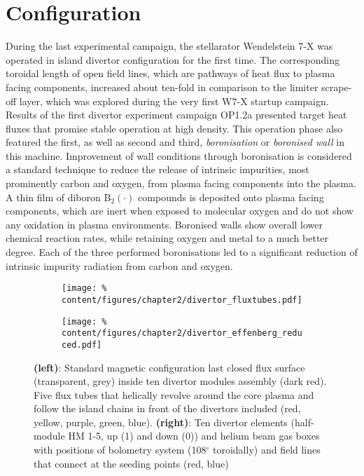     \section{Configuration}\label{sec:configuration}%
%
        During the last experimental campaign, the stellarator Wendelstein 7-X was operated in island divertor configuration for the first time. The corresponding toroidal length of open field lines, which are pathways of heat flux to plasma facing components, increased about ten-fold in comparison to the limiter scrape-off layer, which was explored during the very first W7-X startup campaign. Results of the first divertor experiment campaign OP1.2a presented target heat fluxes that promise stable operation at high density\cite{Pedersen2018}. This operation phase also featured the first, as well as second and third, \textit{boronisation} or \textit{boronised wall} in this machine. Improvement of wall conditions through boronisation is considered a standard technique to reduce the release of intrinsic impurities, most prominently carbon and oxygen, from plasma facing components into the plasma\cite{Winter1989,Winter1992,Meshcheryakov2005,Bedoya2018,Waelbroeck1989,Lipschultz2007}. A thin film of diboron B$_{2}\left(\cdot\right)$ compounds is deposited onto plasma facing components, which are inert when exposed to molecular oxygen and do not show any oxidation in plasma environments. Boronised walls show overall lower chemical reaction rates, while retaining oxygen and metal to a much better degree\cite{Winter1992}. Each of the three performed boronisations led to a significant reduction of intrinsic impurity radiation from carbon and oxygen\cite{Buttenschon2019}.\\%
%
        \begin{figure}[t]%
            \centering%
            \begin{subfigure}{0.4\textwidth}%
                \texttt{[image: \%
                    content/figures/chapter2/divertor\_fluxtubes.pdf]}%
            \end{subfigure}%
            \hfill%
            \begin{subfigure}{0.56\textwidth}%
                \texttt{[image: \%
                    content/figures/chapter2/divertor\_effenberg\_reduced.pdf]}%
            \end{subfigure}%
            \caption{\textbf{(left)}: Standard magnetic configuration last closed flux surface (transparent, grey) inside ten divertor modules assembly (dark red). Five flux tubes that helically revolve around the core plasma and follow the island chains in front of the divertors included (red, yellow, purple, green, blue)\cite{Reimold2021}. \textbf{(right)}: Ten divertor elements (half-module HM 1-5, up (1) and down (0)) and helium beam gas boxes with positions of bolometry system (108$^{\circ}$ toroidally) and field lines that connect at the seeding points (red, blue)\cite{Effenberg2019_seed}}\label{fig:divertors_fluxtubes}%
        \end{figure}%
